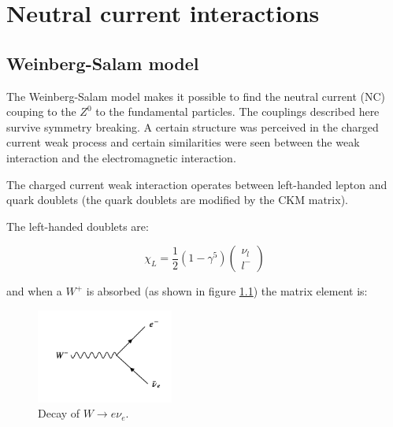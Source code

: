 
\chapter{Neutral current interactions}

\section{Weinberg-Salam model}

The Weinberg-Salam model makes it possible to find the neutral current (NC) couping to the $Z^0$ to the fundamental particles.  The couplings described here survive symmetry breaking.  A certain structure was perceived in the charged current weak process and certain similarities were seen between the weak interaction and the electromagnetic interaction.

The charged current weak interaction operates between left-handed lepton and quark doublets (the quark doublets are modified by the CKM matrix).

The left-handed doublets are:

\[
  \chi_L = \frac{1}{2}\left(1 - \gamma^5\right)
  \left(
  \begin{array}{c}
    \nu_l \\
    l^-
  \end{array}
  \right)
\]

and when a $W^+$ is absorbed (as shown in figure \ref{fig:ch13_WENu}) the matrix element is:

\begin{figure}[!htb]
  \begin{center}
    \includegraphics[width=0.4\textwidth]{images/web_feynman/image_56.png}
    \caption[Decay of $W\to e\nu_e$]{Decay of $W\to e\nu_e$.}
    \label{fig:ch13_WENu}
  \end{center}
\end{figure}

